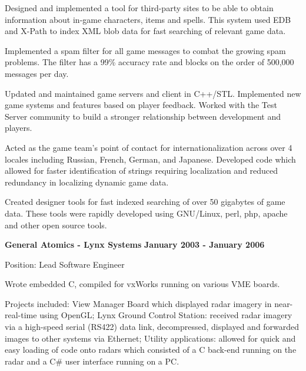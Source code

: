 \documentclass{article}
\begin{document}
\vspace{\baselineskip}
Designed and implemented a tool for third-party sites to be able to obtain
information about in-game characters, items and spells.  This system used 
EDB and X-Path to index XML blob data for fast searching of relevant game data.
\par

\vspace{\baselineskip}
Implemented a spam filter for all game messages to combat the growing spam
problems.  The filter has a 99\% accuracy rate and blocks on the order of
500,000 messages per day.
\par

\vspace{\baselineskip}
Updated and maintained game servers and client in C++/STL.  Implemented new 
game systems and features based on player feedback.  Worked with the Test Server 
community to build a stronger relationship between development and players.
\par

\vspace{\baselineskip}
Acted as the game team's point of contact for internationalization across over 4
locales including Russian, French, German, and Japanese.  Developed code which
allowed for faster identification of strings requiring localization and reduced 
redundancy in localizing dynamic game data.
\par

\vspace{\baselineskip}
Created designer tools for fast indexed searching of over 
50 gigabytes of game data.  These tools were rapidly developed using GNU/Linux, 
perl, php, apache and other open source tools.
\par
\vspace{\baselineskip}

\vspace{\baselineskip}
{\bf General Atomics - Lynx Systems} 
\hfill {\bf January 2003 - January 2006} 
\par
Position: Lead Software Engineer
\vspace{.03in}
\par
Wrote embedded C, compiled for vxWorks running on various VME boards.  
\par
Projects included: View Manager Board which displayed radar imagery in near-real-time
using OpenGL; Lynx Ground Control Station: received radar imagery via a
high-speed serial (RS422) data link, decompressed, displayed and forwarded
images to other systems via Ethernet; Utility applications: allowed for
quick and easy loading of code onto radars which consisted of a C back-end
running on the radar and a C\# user interface running on a PC.  
\par
\end{document}
